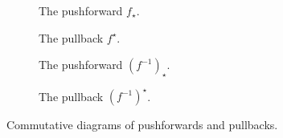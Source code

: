 \documentclass[12pt]{article}
\theoremstyle{theorem}
\begin{document}
\begin{figure}[h]
  \centering
  
  \begin{subfigure}[b]{0.4\textwidth}
    \centering
    \caption{The pushforward $f_{\star}$.}
  \end{subfigure}
  \begin{subfigure}[b]{0.4\textwidth}
    \centering
    \caption{The pullback $f^\star$.}
  \end{subfigure}
  \par\bigskip
  \begin{subfigure}[b]{0.4\textwidth}
    \centering
    \caption{The pushforward $(f^{-1})_\star$.}
  \end{subfigure}
  \begin{subfigure}[b]{0.4\textwidth}
    \centering
    \caption{The pullback $(f^{-1})^\star$.}
  \end{subfigure}
  \label{fig:com-diag}
  \caption{Commutative diagrams of pushforwards and pullbacks.}
  
\end{figure}
\end{document}
